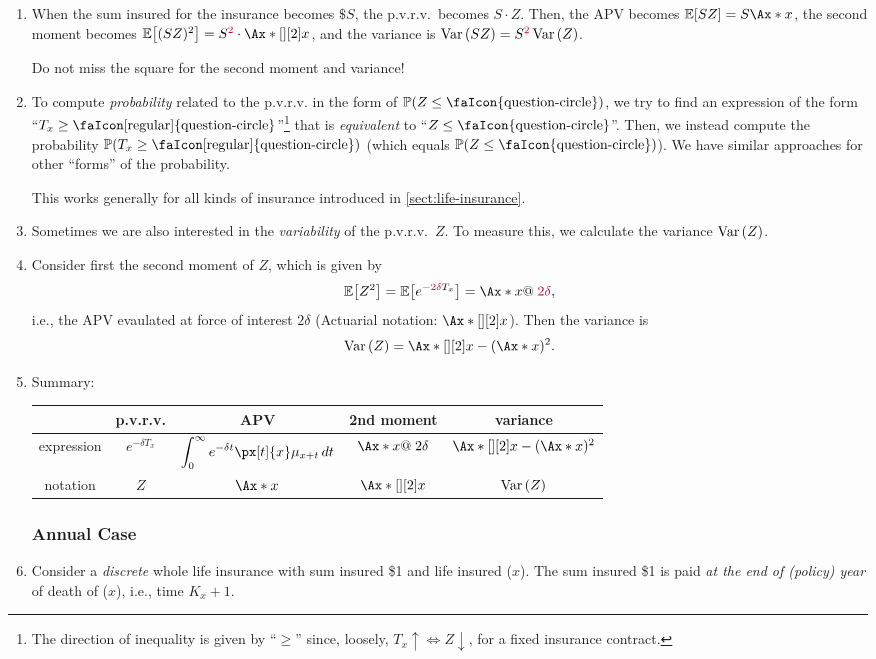 \begin{enumerate}
\item When the sum insured for the insurance becomes \(\$ S\), the p.v.r.v.\
becomes \(S\cdot Z\). Then, the APV becomes \(\expv{SZ}=S\Ax*{x}\), the second
moment becomes \(\expv{(SZ)^2}=S^{\color{purple}2}\cdot\Ax*[][2]{x}\), and the
variance is \(\operatorname{Var}\qty(SZ)=S^{\color{purple}2}\operatorname{Var}\qty(Z)\).
\begin{warning}
Do not miss the square for the second moment and variance!
\end{warning}
\item To compute \emph{probability} related to the p.v.r.v. in the form
of \(\prob{Z\le \text{\faIcon{question-circle}}}\), we try to find an
expression of the form
``\(T_x\ge\text{\faIcon[regular]{question-circle}}\)''\footnote{The direction
of inequality is given by ``\(\ge\)'' since, loosely, \(T_x\uparrow\iff
Z\downarrow\), for a fixed insurance contract.}  that is \emph{equivalent} to
``\(Z\le \text{\faIcon{question-circle}}\)''. Then, we instead compute the
probability \(\prob{T_x\ge\text{\faIcon[regular]{question-circle}}}\) (which
equals \(\prob{Z\le \text{\faIcon{question-circle}}}\)). We have similar
approaches for other ``forms'' of the probability.
\begin{note}
This works generally for all kinds of insurance introduced in
\cref{sect:life-insurance}.
\end{note}
\item Sometimes we are also interested in the \emph{variability} of the
p.v.r.v.\ \(Z\). To measure this, we calculate the variance \(\operatorname{Var}\qty(Z)\).
\item Consider first the second moment of \(Z\), which is given by
\[
\expv{Z^2}=\expv{e^{-{\color{purple} 2\delta} T_x}}=\Ax*{x}@\;{\color{purple} 2\delta},
\]
i.e., the APV evaulated at force of interest \(2\delta\) (Actuarial notation:
\(\Ax*[][2]{x}\)). Then the variance is
\[
\vari{Z}=\Ax*[][2]{x}-(\Ax*{x})^2.
\]
\item
\label{it:cts-whole-life-fmlas}
 Summary:

\begin{tabular}{ccccc}
\toprule
&p.v.r.v.&APV&2nd moment&variance\\
\midrule
expression&\(e^{-\delta T_x}\)&\(\displaystyle\int_{0}^{\infty}e^{-\delta t}\px[t]{x}\mu_{x+t}\,dt\)
&\(\Ax*{x}@\;2\delta\)&\(\Ax*[][2]{x}-(\Ax*{x})^2\)\\
notation&\(Z\)&\(\Ax*{x}\)&\(\Ax*[][2]{x}\)&\(\operatorname{Var}\qty(Z)\)\\
\bottomrule
\end{tabular}
\subsubsection*{Annual Case}
\item Consider a \emph{discrete} whole life insurance with sum insured
\faIcon{money-bill-wave} \$1 and life insured (\(x\)). The sum insured \$1 is
paid \emph{at the end of (policy) year} of death of (\(x\)), i.e., time
\(K_x+1\).


\end{enumerate}
